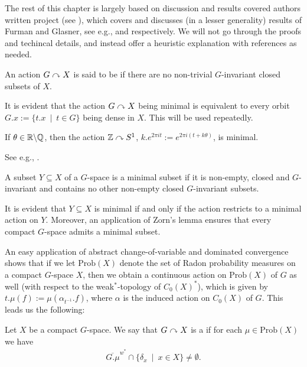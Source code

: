 The rest of this chapter is largely based on discussion and results covered authors written project (see \cite{bscp}), which covers and discusses (in a lesser generality) results of Furman and Glasner, see e.g., \cite{furman2003minimal} and \cite{glasner1976proximal} respectively. We will not go through the proofs and techincal details, and instead offer a heuristic explanation with references as needed.
\begin{definition}
	An action $G \stackrel{}{\curvearrowright} X$ is said to be  if there are no non-trivial $G$-invariant closed subsets of $X$.
\end{definition}
\begin{remark}
	It is evident that the action $G \stackrel{}{\curvearrowright} X$ being minimal is equivalent to every orbit $G.x := \{t.x \ \mid \ t \in G\}$ being dense in $X$. This will be used repeatedly.
\end{remark}
\begin{example}
	If $\theta \in \mathbb{R} \backslash \mathbb{Q}$, then the action $\mathbb{Z} \stackrel{}{\curvearrowright} S^1$, $k.e^{2\pi i t}:= e^{2 \pi i (t+k\theta)}$, is minimal.	
\end{example}
See e.g., \mbox{\cite[Example 4.6]{bscp}}. 
\begin{definition}
	A subset $Y \subseteq X$ of a $G$-space is a minimal subset if it is non-empty, closed and $G$-invariant and contains no other non-empty closed $G$-invariant subsets.
\end{definition}
\begin{remark}
	It is evident that $Y \subseteq X$ is minimal if and only if the action restricts to a minimal action on $Y$. Moreover, an application of Zorn's lemma ensures that every compact $G$-space admits a minimal subset.
\end{remark}
An easy application of abstract change-of-variable and dominated convergence shows that if we let $\mathrm{Prob}(X)$ denote the set of Radon probability measures on a compact $G$-space $X$, then we obtain a continuous action on $\mathrm{Prob}(X)$ of $G$ as well (with respect to the weak$^*$-topology of $C_0(X)^*$), which is given by $t.\mu(f) := \mu(\alpha_{t^{-1}}.f)$, where $\alpha$ is the induced action on $C_0(X)$ of $G$. This leads us the following:
\begin{definition}
	Let $X$ be a compact $G$-space. We say that $G \stackrel{}{\curvearrowright} X$ is a  if for each $\mu \in \mathrm{Prob}(X)$ we have
	\begin{align*}
		\overline{G.\mu}^{w^*} \cap \{\delta_x \ \mid \ x \in X\} \neq \emptyset.
	\end{align*}
\end{definition}
